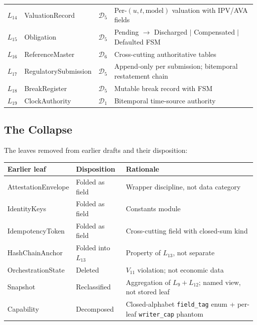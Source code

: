 \documentclass[11pt,a4paper]{article}
\begin{document}
\begin{center}
\begin{longtable}{p{2cm}p{4.5cm}p{1.6cm}p{6cm}}
$L_{14}$ & ValuationRecord             & $\mathcal{D}_5$ & Per-$(u,t,\text{model})$ valuation with IPV/AVA fields \\
$L_{15}$ & Obligation                  & $\mathcal{D}_5$ & Pending $\to$ Discharged $|$ Compensated $|$ Defaulted FSM \\
$L_{16}$ & ReferenceMaster             & $\mathcal{D}_6$ & Cross-cutting authoritative tables \\
$L_{17}$ & RegulatorySubmission        & $\mathcal{D}_5$ & Append-only per submission; bitemporal restatement chain \\
$L_{18}$ & BreakRegister               & $\mathcal{D}_5$ & Mutable break record with FSM \\
$L_{19}$ & ClockAuthority              & $\mathcal{D}_1$ & Bitemporal time-source authority \\
\end{longtable}
\end{center}

\subsection{The Collapse}
\label{sec:tax-collapse}

The leaves removed from earlier drafts and their disposition:

\begin{center}
\begin{tabular}{p{3.5cm}p{4cm}p{7cm}}
\toprule
\textbf{Earlier leaf} & \textbf{Disposition} & \textbf{Rationale} \\
\midrule
AttestationEnvelope    & Folded as field & Wrapper discipline, not data category \\
IdentityKeys           & Folded as field & Constants module \\
IdempotencyToken       & Folded as field & Cross-cutting field with closed-sum kind \\
HashChainAnchor        & Folded into $L_{13}$ & Property of $L_{13}$, not separate \\
OrchestrationState     & Deleted          & $V_{11}$ violation; not economic data \\
Snapshot               & Reclassified     & Aggregation of $L_9 + L_{12}$; named view, not stored leaf \\
Capability             & Decomposed       & Closed-alphabet \texttt{field\_tag} enum + per-leaf \texttt{writer\_cap} phantom \\
\bottomrule
\end{tabular}
\end{center}
\end{document}
